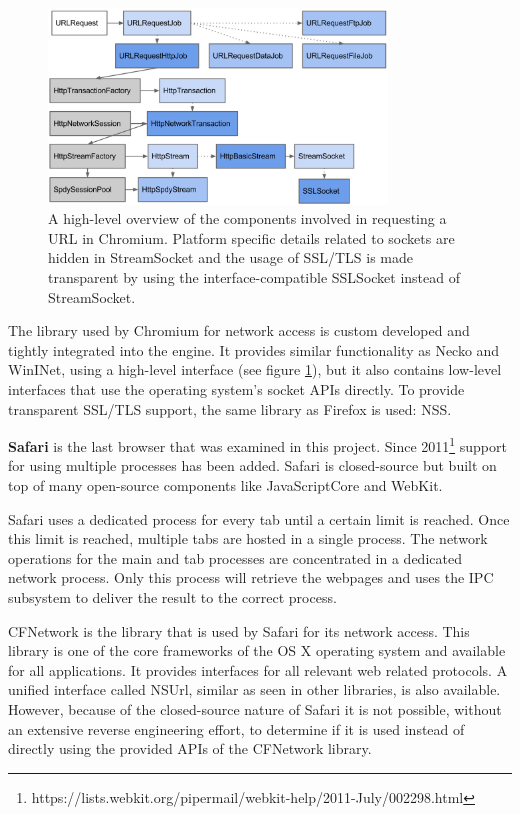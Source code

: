 \begin{figure}[h]
    \centering
    \includegraphics[width=9cm]{Images/Chrome_network.png}
    \caption{A high-level overview of the components involved in requesting a URL in Chromium. Platform specific details related to sockets are hidden in StreamSocket and the usage of SSL/TLS is made transparent by using the interface-compatible SSLSocket instead of StreamSocket. \cite{ChromeNetwork}}
    \label{fig:chrome_network}
\end{figure}

The library used by Chromium for network access is custom developed and tightly integrated into the engine. It provides similar functionality as Necko and WinINet, using a high-level interface (see figure \ref{fig:chrome_network}), but it also contains low-level interfaces that use the operating system's socket APIs directly. To provide transparent SSL/TLS support, the same library as Firefox is used: NSS.

\textbf{Safari} is the last browser that was examined in this project. Since 2011\footnote{https://lists.webkit.org/pipermail/webkit-help/2011-July/002298.html} support for using multiple processes has been added. Safari is closed-source but built on top of many open-source components like JavaScriptCore and WebKit.

Safari uses a dedicated process for every tab until a certain limit is reached. Once this limit is reached, multiple tabs are hosted in a single process. The network operations for the main and tab processes are concentrated in a dedicated network process. Only this process will retrieve the webpages and uses the IPC subsystem to deliver the result to the correct process. 

CFNetwork is the library that is used by Safari for its network access. This library is one of the core frameworks of the OS X operating system and available for all applications. It provides interfaces for all relevant web related protocols. A unified interface called NSUrl, similar as seen in other libraries, is also available. However, because of the closed-source nature of Safari it is not possible, without an extensive reverse engineering effort, to determine if it is used instead of directly using the provided APIs of the CFNetwork library.


